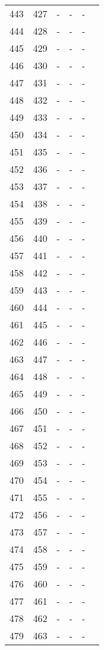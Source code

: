 \begin{longtable}{rrrrrr}
  443 & 427 & - & - & - &  \\ 
  444 & 428 & - & - & - &  \\ 
  445 & 429 & - & - & - &  \\ 
  446 & 430 & - & - & - &  \\ 
  447 & 431 & - & - & - &  \\ 
  448 & 432 & - & - & - &  \\ 
  449 & 433 & - & - & - &  \\ 
  450 & 434 & - & - & - &  \\ 
  451 & 435 & - & - & - &  \\ 
  452 & 436 & - & - & - &  \\ 
  453 & 437 & - & - & - &  \\ 
  454 & 438 & - & - & - &  \\ 
  455 & 439 & - & - & - &  \\ 
  456 & 440 & - & - & - &  \\ 
  457 & 441 & - & - & - &  \\ 
  458 & 442 & - & - & - &  \\ 
  459 & 443 & - & - & - &  \\ 
  460 & 444 & - & - & - &  \\ 
  461 & 445 & - & - & - &  \\ 
  462 & 446 & - & - & - &  \\ 
  463 & 447 & - & - & - &  \\ 
  464 & 448 & - & - & - &  \\ 
  465 & 449 & - & - & - &  \\ 
  466 & 450 & - & - & - &  \\ 
  467 & 451 & - & - & - &  \\ 
  468 & 452 & - & - & - &  \\ 
  469 & 453 & - & - & - &  \\ 
  470 & 454 & - & - & - &  \\ 
  471 & 455 & - & - & - &  \\ 
  472 & 456 & - & - & - &  \\ 
  473 & 457 & - & - & - &  \\ 
  474 & 458 & - & - & - &  \\ 
  475 & 459 & - & - & - &  \\ 
  476 & 460 & - & - & - &  \\ 
  477 & 461 & - & - & - &  \\ 
  478 & 462 & - & - & - &  \\ 
  479 & 463 & - & - & - &  \\ 

\end{longtable}
